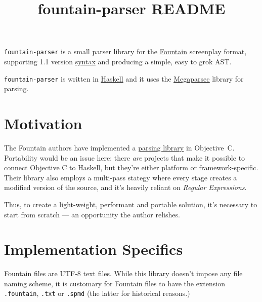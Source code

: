 \documentclass[12pt]{article}
\newcommand{\link}[2]{\underline{\color{darkblue}\href{#1}{#2}}}
\begin{document}
\title{\textbf{fountain-parser README}}
\author{}
\date{}
\maketitle

\texttt{fountain-parser} is a small parser library for the
\link{https://fountain.io/}{Fountain} screenplay format,
supporting 1.1 version
\link{https://fountain.io/syntax/}{syntax} and
producing a simple, easy to grok \textsf{AST}.

\texttt{fountain-parser} is written in
\link{https://haskell.org}{Haskell} and it uses the
\link{https://hackage.haskell.org/package/megaparsec}{Megaparsec}
library for parsing.

\section{Motivation}
The Fountain authors have implemented a 
\link{https://github.com/nyousefi/Fountain}{parsing library}
in \textsf{Objective~C}. Portability would be an issue here:
there \emph{are} projects that make it possible to connect
Objective C to Haskell, but they're either platform or
framework-specific.  Their library also employs a multi-pass
stategy where every stage creates a modified version of the
source, and it's heavily reliant on \emph{Regular Expressions}.

Thus, to create a light-weight, performant and portable
solution, it's necessary to start from scratch --- an opportunity
the author relishes.

\section{Implementation Specifics}
Fountain files are \textsf{UTF-8} text files. While this library
doesn't impose any file naming scheme, it is customary for Fountain
files to have the extension \texttt{.fountain}, \texttt{.txt} or
\texttt{.spmd} (the latter for historical reasons.)
\end{document}
